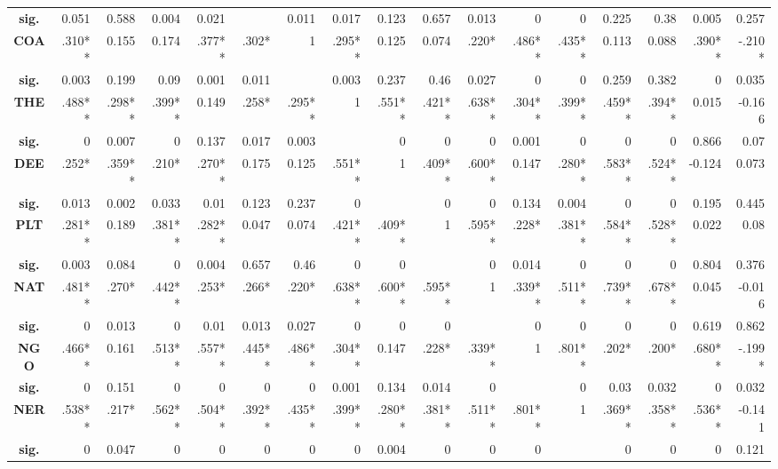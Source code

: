 \documentclass[conference]{IEEEtran}
\begin{document}
\begin{table}[]
{\begin{tabular}{|c|rrrrrr|rrrr|rrrrrr|}
      \textbf{sig.} & 0.051 & 0.588 & 0.004 & 0.021 &  & 0.011 & 0.017 & 0.123 & 0.657 & 0.013 & 0 & 0 & 0.225 & 0.38 & 0.005 & 0.257 \\
      \textbf{COA} & .310** & 0.155 & 0.174 & .377** & .302* & 1 & .295** & 0.125 & 0.074 & .220* & .486** & .435** & 0.113 & 0.088 & .390** & -.210* \\
      \textbf{sig.} & 0.003 & 0.199 & 0.09 & 0.001 & 0.011 &  & 0.003 & 0.237 & 0.46 & 0.027 & 0 & 0 & 0.259 & 0.382 & 0 & 0.035 \\ \hline
      \textbf{THE} & .488** & .298** & .399** & 0.149 & .258* & .295** & 1 & .551** & .421** & .638** & .304** & .399** & .459** & .394** & 0.015 & -0.166 \\
      \textbf{sig.} & 0 & 0.007 & 0 & 0.137 & 0.017 & 0.003 &  & 0 & 0 & 0 & 0.001 & 0 & 0 & 0 & 0.866 & 0.07 \\
      \textbf{DEE} & .252* & .359** & .210* & .270** & 0.175 & 0.125 & .551** & 1 & .409** & .600** & 0.147 & .280** & .583** & .524** & -0.124 & 0.073 \\
      \textbf{sig.} & 0.013 & 0.002 & 0.033 & 0.01 & 0.123 & 0.237 & 0 &  & 0 & 0 & 0.134 & 0.004 & 0 & 0 & 0.195 & 0.445 \\
      \textbf{PLT} & .281** & 0.189 & .381** & .282** & 0.047 & 0.074 & .421** & .409** & 1 & .595** & .228* & .381** & .584** & .528** & 0.022 & 0.08 \\
      \textbf{sig.} & 0.003 & 0.084 & 0 & 0.004 & 0.657 & 0.46 & 0 & 0 &  & 0 & 0.014 & 0 & 0 & 0 & 0.804 & 0.376 \\
      \textbf{NAT} & .481** & .270* & .442** & .253* & .266* & .220* & .638** & .600** & .595** & 1 & .339** & .511** & .739** & .678** & 0.045 & -0.016 \\
      \textbf{sig.} & 0 & 0.013 & 0 & 0.01 & 0.013 & 0.027 & 0 & 0 & 0 &  & 0 & 0 & 0 & 0 & 0.619 & 0.862 \\ \hline
      \textbf{NGO} & .466** & 0.161 & .513** & .557** & .445** & .486** & .304** & 0.147 & .228* & .339** & 1 & .801** & .202* & .200* & .680** & -.199* \\
      \textbf{sig.} & 0 & 0.151 & 0 & 0 & 0 & 0 & 0.001 & 0.134 & 0.014 & 0 &  & 0 & 0.03 & 0.032 & 0 & 0.032 \\
      \textbf{NER} & .538** & .217* & .562** & .504** & .392** & .435** & .399** & .280** & .381** & .511** & .801** & 1 & .369** & .358** & .536** & -0.141 \\
      \textbf{sig.} & 0 & 0.047 & 0 & 0 & 0 & 0 & 0 & 0.004 & 0 & 0 & 0 &  & 0 & 0 & 0 & 0.121 \\

\end{tabular}}
\end{table}
\end{document}
